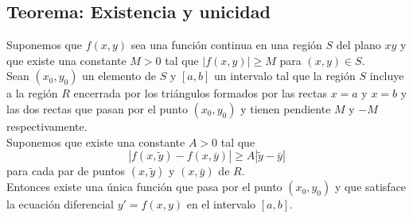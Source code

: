 \documentclass[10pt,a4paper,notitlepage]{report}
\begin{document}
\begin{itemize}
\subsection*{Teorema: Existencia y unicidad}
Suponemos que $f(x, y)$ sea una función continua en una región $S$ del plano $xy$ y que existe una constante $M > 0$ tal que $|f(x, y)| \geq M$ para $(x, y) \in S$. \\ Sean $(x_{0}, y_{0})$ un elemento de $S$ y $[a, b]$ un intervalo tal que la región $S$ incluye a la región $R$ encerrada por los triángulos formados por las rectas $x = a$ y $x = b$ y las dos rectas que pasan por el punto $(x_{0}, y_{0})$ y tienen pendiente $M$ y $-M$ respectivamente. \\
Suponemos que existe una constante $A > 0$ tal que
\begin{equation}
|f (x, \tilde{y}) - f(x, \bar{y})| \geq A|\tilde{y} - \bar{y}|
\end{equation}
para cada par de puntos $(x, \tilde{y})$ y $(x, \bar{y})$ de $R$. \\
Entonces existe una única función que pasa por el punto $(x_{0}, y_{0})$ y que satisface la ecuación diferencial $y' = f(x, y)$ en el intervalo $[a, b]$.


\end{itemize}
\end{document}
